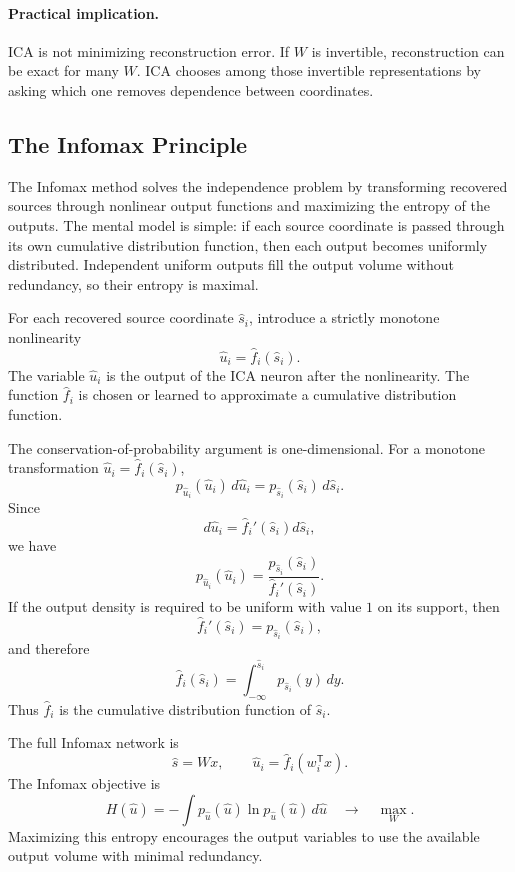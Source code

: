\paragraph{Practical implication.}
ICA is not minimizing reconstruction error. If \(W\) is invertible, reconstruction can be exact for many \(W\). ICA chooses among those invertible representations by asking which one removes dependence between coordinates.

\subsection{The Infomax Principle}

The Infomax method solves the independence problem by transforming recovered sources through nonlinear output functions and maximizing the entropy of the outputs. The mental model is simple: if each source coordinate is passed through its own cumulative distribution function, then each output becomes uniformly distributed. Independent uniform outputs fill the output volume without redundancy, so their entropy is maximal.

For each recovered source coordinate \(\hat{s}_i\), introduce a strictly monotone nonlinearity
\[
  \hat{u}_i=\hat{f}_i(\hat{s}_i).
\]
The variable \(\hat{u}_i\) is the output of the ICA neuron after the nonlinearity. The function \(\hat{f}_i\) is chosen or learned to approximate a cumulative distribution function.

The conservation-of-probability argument is one-dimensional. For a monotone transformation \(\hat{u}_i=\hat{f}_i(\hat{s}_i)\),
\[
  p_{\hat{u}_i}(\hat{u}_i)\,d\hat{u}_i
  =
  p_{\hat{s}_i}(\hat{s}_i)\,d\hat{s}_i.
\]
Since
\[
  d\hat{u}_i
  =
  \hat{f}_i'(\hat{s}_i)d\hat{s}_i,
\]
we have
\[
  p_{\hat{u}_i}(\hat{u}_i)
  =
  \frac{p_{\hat{s}_i}(\hat{s}_i)}{\hat{f}_i'(\hat{s}_i)}.
\]
If the output density is required to be uniform with value \(1\) on its support, then
\[
  \hat{f}_i'(\hat{s}_i)=p_{\hat{s}_i}(\hat{s}_i),
\]
and therefore
\[
  \hat{f}_i(\hat{s}_i)
  =
  \int_{-\infty}^{\hat{s}_i}
  p_{\hat{s}_i}(y)\,dy.
\]
Thus \(\hat{f}_i\) is the cumulative distribution function of \(\hat{s}_i\).

The full Infomax network is
\[
  \hat{s}=Wx,
  \qquad
  \hat{u}_i=\hat{f}_i(w_i^{\mathsf{T}}x).
\]
The Infomax objective is
\[
  H(\hat{u})
  =
  -\int p_{\hat{u}}(\hat{u})\ln p_{\hat{u}}(\hat{u})\,d\hat{u}
  \quad \longrightarrow \quad \max_W.
\]
Maximizing this entropy encourages the output variables to use the available output volume with minimal redundancy.

